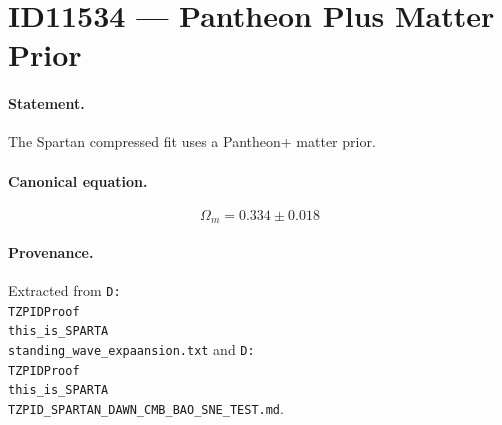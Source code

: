 \section*{ID11534 --- Pantheon Plus Matter Prior}

\paragraph{Statement.}
The Spartan compressed fit uses a Pantheon+ matter prior.

\paragraph{Canonical equation.}
\[
\Omega_m=0.334\pm0.018
\]

\paragraph{Provenance.}
Extracted from \texttt{D:\\TZPIDProof\\this\_is\_SPARTA\\standing\_wave\_expaansion.txt} and \texttt{D:\\TZPIDProof\\this\_is\_SPARTA\\TZPID\_SPARTAN\_DAWN\_CMB\_BAO\_SNE\_TEST.md}.
